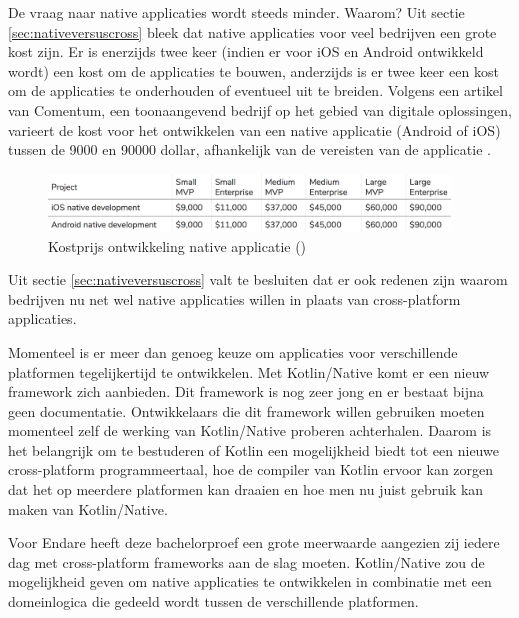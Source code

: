 De vraag naar native applicaties wordt steeds minder. Waarom? Uit sectie \ref{sec:nativeversuscross} bleek dat native applicaties voor veel bedrijven een grote kost zijn. Er is enerzijds twee keer (indien er voor iOS en Android ontwikkeld wordt) een kost om de applicaties te bouwen, anderzijds is er twee keer een kost om de applicaties te onderhouden of eventueel uit te breiden. Volgens een artikel van Comentum, een toonaangevend bedrijf op het gebied van digitale oplossingen, varieert de kost voor het ontwikkelen van een native applicatie (Android of iOS) tussen de 9000 en 90000 dollar, afhankelijk van de vereisten van de applicatie \autocite{NativeDevelopmentCost}. 

\begin{figure} [ht]
	\centering
	\includegraphics[width=0.95\textwidth]{img/nativeappkost.png}
	\caption{Kostprijs ontwikkeling native applicatie (\cite{NativeDevelopmentCost})}
	\label{fig:nativeappkost}
\end{figure}

Uit sectie \ref{sec:nativeversuscross} valt te besluiten dat er ook redenen zijn waarom bedrijven nu net wel native applicaties willen in plaats van cross-platform applicaties. 

Momenteel is er meer dan genoeg keuze om applicaties voor verschillende platformen tegelijkertijd te ontwikkelen. Met Kotlin/Native komt er een nieuw framework zich aanbieden. Dit framework is nog zeer jong en er bestaat bijna geen documentatie. Ontwikkelaars die dit framework willen gebruiken moeten momenteel zelf de werking van Kotlin/Native proberen achterhalen. Daarom is het belangrijk om te bestuderen of Kotlin een mogelijkheid biedt tot een nieuwe cross-platform programmeertaal, hoe de compiler van Kotlin ervoor kan zorgen dat het op meerdere platformen kan draaien en hoe men nu juist gebruik kan maken van Kotlin/Native. 

Voor Endare heeft deze bachelorproef een grote meerwaarde aangezien zij iedere dag met cross-platform frameworks aan de slag moeten. Kotlin/Native zou de mogelijkheid geven om native applicaties te ontwikkelen in combinatie met een domeinlogica die gedeeld wordt tussen de verschillende platformen.


